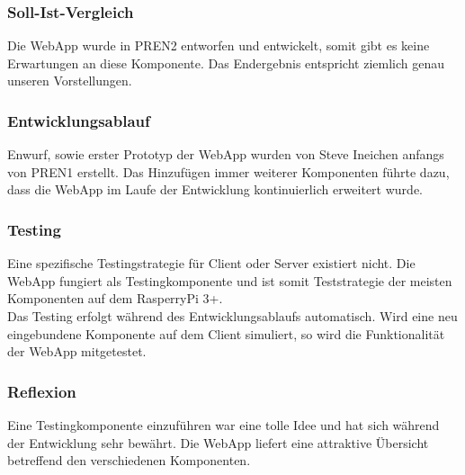 \documentclass[../../main.tex]{subfiles}
\begin{document}
\subsubsection{Soll-Ist-Vergleich}
Die WebApp wurde in PREN2 entworfen und entwickelt, somit gibt es keine Erwartungen an diese Komponente. Das Endergebnis entspricht ziemlich genau unseren Vorstellungen.

\subsubsection{Entwicklungsablauf}
Enwurf, sowie erster Prototyp der WebApp wurden von Steve Ineichen anfangs von PREN1 erstellt. Das Hinzufügen immer weiterer Komponenten führte dazu, dass die WebApp im Laufe der Entwicklung kontinuierlich erweitert wurde.

\subsubsection{Testing}
Eine spezifische Testingstrategie für Client oder Server existiert nicht. Die WebApp fungiert als Testingkomponente und ist somit Teststrategie der meisten Komponenten auf dem RasperryPi 3+.
\\
Das Testing erfolgt während des Entwicklungsablaufs automatisch. Wird eine neu eingebundene Komponente auf dem Client simuliert, so wird die Funktionalität der WebApp mitgetestet.

\subsubsection{Reflexion}
Eine Testingkomponente einzuführen war eine tolle Idee und hat sich während der Entwicklung sehr bewährt. Die WebApp liefert eine attraktive Übersicht betreffend den verschiedenen Komponenten.
\end{document}
